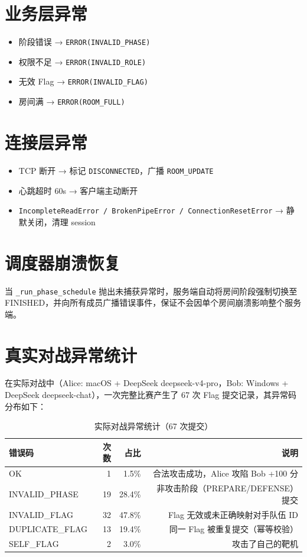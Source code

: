 \documentclass[12pt,a4paper]{ctexbook}
\begin{document}
\section{业务层异常}

\begin{itemize}
  \item 阶段错误 → \texttt{ERROR(INVALID\_PHASE)}
  \item 权限不足 → \texttt{ERROR(INVALID\_ROLE)}
  \item 无效 Flag → \texttt{ERROR(INVALID\_FLAG)}
  \item 房间满 → \texttt{ERROR(ROOM\_FULL)}
\end{itemize}

\section{连接层异常}

\begin{itemize}
  \item TCP 断开 → 标记 \texttt{DISCONNECTED}，广播 \texttt{ROOM\_UPDATE}
  \item 心跳超时 60s → 客户端主动断开
  \item \texttt{IncompleteReadError / BrokenPipeError / ConnectionResetError} → 静默关闭，清理 session
\end{itemize}

\section{调度器崩溃恢复}

当 \texttt{\_run\_phase\_schedule} 抛出未捕获异常时，服务端自动将房间阶段强制切换至 FINISHED，并向所有成员广播错误事件，保证不会因单个房间崩溃影响整个服务端。

\section{真实对战异常统计}

在实际对战中（Alice: macOS + DeepSeek deepseek-v4-pro，Bob: Windows + DeepSeek deepseek-chat），一次完整比赛产生了 67 次 Flag 提交记录，其异常码分布如下：

\begin{table}[htbp]
\centering
\caption{实际对战异常统计（67 次提交）}
\begin{tabular}{@{}lrrr@{}}
\toprule
\textbf{错误码} & \textbf{次数} & \textbf{占比} & \textbf{说明} \\
\midrule
OK & 1 & 1.5\% & 合法攻击成功，Alice 攻陷 Bob +100 分 \\
INVALID\_PHASE & 19 & 28.4\% & 非攻击阶段（PREPARE/DEFENSE）提交 \\
INVALID\_FLAG & 32 & 47.8\% & Flag 无效或未正确映射对手队伍 ID \\
DUPLICATE\_FLAG & 13 & 19.4\% & 同一 Flag 被重复提交（幂等校验） \\
SELF\_FLAG & 2 & 3.0\% & 攻击了自己的靶机 \\
\bottomrule
\end{tabular}
\end{table}
\end{document}
